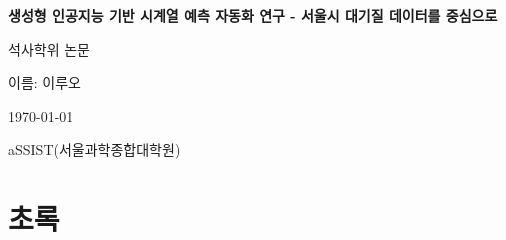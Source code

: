 \documentclass[12pt,ko,a4,]{report}
\begin{document}
\begin{titlepage}
\begin{center}
\vspace*{2cm}

{\Huge\textbf{생성형 인공지능 기반 시계열 예측 자동화 연구 - 서울시
대기질 데이터를 중심으로}}\\

\vspace{1.5cm}

{\LARGE 석사학위 논문}\\

\vspace{2cm}

{\large 이름: 이루오}\\

\vspace{3cm}

{\large \today}\\

\vspace{2cm}

{\large aSSIST(서울과학종합대학원)}\\
\end{center}
\end{titlepage}

\chapter*{초록}



\newpage
\tableofcontents
\newpage

\listoffigures
\newpage

\listoftables
\newpage
\end{document}

